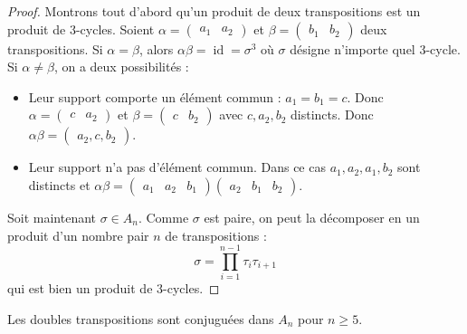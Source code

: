   \begin{proof}
    Montrons tout d'abord qu'un produit de deux transpositions est un produit de $3$-cycles. Soient $\alpha = \begin{pmatrix} a_1 & a_2 \end{pmatrix}$ et $\beta = \begin{pmatrix} b_1 & b_2 \end{pmatrix}$ deux transpositions. Si $\alpha = \beta$, alors $\alpha\beta = \operatorname{id} = \sigma^3$ où $\sigma$ désigne n'importe quel $3$-cycle.
    \newpar
    Si $\alpha \neq \beta$, on a deux possibilités :
    \begin{itemize}
      \item Leur support comporte un élément commun : $a_1 = b_1 = c$. Donc $\alpha = \begin{pmatrix} c & a_2 \end{pmatrix}$ et $\beta = \begin{pmatrix} c & b_2 \end{pmatrix}$ avec $c, a_2, b_2$ distincts. Donc $\alpha\beta = \begin{pmatrix} a_2, c, b_2 \end{pmatrix}$.
      \item Leur support n'a pas d'élément commun. Dans ce cas $a_1, a_2, a_1, b_2$ sont distincts et $\alpha\beta = \begin{pmatrix} a_1 & a_2 & b_1 \end{pmatrix} \begin{pmatrix} a_2 & b_1 & b_2 \end{pmatrix}$.
    \end{itemize}
    Soit maintenant $\sigma \in A_n$. Comme $\sigma$ est paire, on peut la décomposer en un produit d'un nombre pair $n$ de transpositions :
    \[ \sigma = \prod_{i=1}^{n-1} \tau_i\tau_{i+1} \]
    qui est bien un produit de $3$-cycles.
  \end{proof}

  
  \begin{lemma}
    \label{simplicite-du-groupe-alterne-3}
    Les doubles transpositions sont conjuguées dans $A_n$ pour $n \geq 5$.
  \end{lemma}
  
